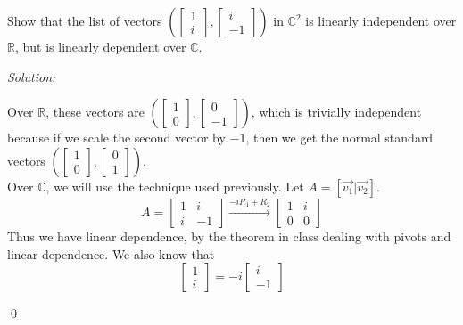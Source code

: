 \documentclass[11 pt]{article}
\newenvironment{problem}[2][Problem]{\begin{trivlist}
\item[\hskip \labelsep {\bfseries #1}\hskip \labelsep {\bfseries #2.}]}{\end{trivlist}}
\newenvironment{sol}
    {\emph{Solution:}
    }
    {
    \qed
    }
\theoremstyle{definition}
\newcommand{\C}{\mathbb{C}} %
\newcommand{\R}{\mathbb{R}} %
\begin{document}
\begin{problem}{3.1.8}
Show that the list of vectors $\left(\begin{bmatrix}
1\\ i
\end{bmatrix}, \begin{bmatrix}
i \\ -1
\end{bmatrix}\right )$ in $\C^2$ is linearly independent over $\R$, but is linearly dependent over $\C$.
\end{problem}
\begin{sol}
Over $\R$, these vectors are $\left ( \begin{bmatrix}
1 \\ 0
\end{bmatrix},
\begin{bmatrix}
0\\-1
\end{bmatrix}\right )
$, which is trivially independent because if we scale the second vector by $-1$, then we get the normal standard vectors $\left ( 
\begin{bmatrix}
1\\0
\end{bmatrix},
\begin{bmatrix}
0\\1
\end{bmatrix}
\right )$.\\
\hline
Over $\C$, we will use the technique used previously. Let $A=[\vec{v_1}|\vec{v_2}]$.
\[A=\begin{bmatrix}
1 & i\\
i & -1
\end{bmatrix}\xrightarrow{-iR_1+R_2}\begin{bmatrix}
1 & i\\
0 & 0
\end{bmatrix}\]
Thus we have linear dependence, by the theorem in class dealing with pivots and linear dependence.
We also know that
\[\begin{bmatrix}
1\\i
\end{bmatrix}=-i\begin{bmatrix}
i\\-1
\end{bmatrix}\]
\end{sol}
\end{document}

